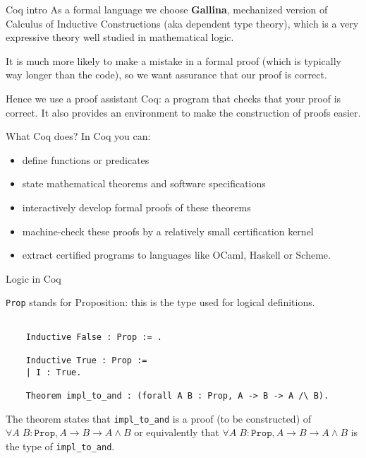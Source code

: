 \documentclass[10pt]{beamer}
\begin{document}
\begin{frame}{Coq intro}
  As a formal language we choose {\bf Gallina}, mechanized version of Calculus of Inductive Constructions (aka dependent type theory), which is a very expressive theory well studied in mathematical logic.

  \smallskip
  
  It is much more likely to make a mistake in a formal proof (which is typically way longer than the code), so we want assurance that our proof is correct.
  \smallskip
  
  Hence we use a proof assistant Coq: a program that checks that your proof is correct. It also provides an environment to make the construction of proofs easier. 
  
  
\end{frame}

\begin{frame}{What Coq does?}
  In Coq you can:
  \begin{itemize}
  
    \item define functions or predicates
   \item state mathematical theorems and software specifications
    \item  interactively develop formal proofs of these theorems
   \item machine-check these proofs by a relatively small certification kernel
    \item extract certified programs to languages like OCaml, Haskell or Scheme.
    \end{itemize}

  \end{frame}

  \begin{frame}[fragile]{Logic in Coq}

    \texttt{Prop} stands for Proposition: this is the type used for logical definitions.
    
  \begin{lstlisting}[language=Coq]

    Inductive False : Prop := .

    Inductive True : Prop :=
    | I : True.

    Theorem impl_to_and : (forall A B : Prop, A -> B -> A /\ B).

  \end{lstlisting}
  The theorem states that \texttt{impl\_to\_and} is a proof (to be constructed) of $\forall A \; B : \texttt{Prop}, A \rightarrow B \rightarrow A \wedge B$ or equivalently
that $\forall A \; B : \texttt{Prop}, A \rightarrow B \rightarrow A \wedge B$ is the type of \texttt{impl\_to\_and}. 
 
\end{frame}
\end{document}
